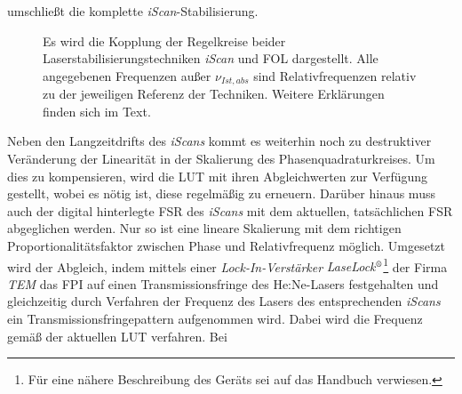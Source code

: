 umschließt die komplette \textit{iScan}-Stabilisierung.\par \begin{figure}[h]
 	\centering
	\caption[Regelkreis - Kopplung]{Es wird die
	Kopplung der Regelkreise beider
	Laserstabilisierungstechniken \textit{iScan} und
	FOL dargestellt. Alle
	angegebenen Frequenzen außer $\nu_{Ist,abs}$ sind
	Relativfrequenzen relativ zu der jeweiligen
	Referenz der Techniken. Weitere Erklärungen
	finden sich im Text.}\label{fig:regelkreis_kopplung}
\end{figure}
Neben den Langzeitdrifts des \textit{iScans} kommt es weiterhin noch zu
destruktiver Veränderung der Linearität in der Skalierung des Phasenquadraturkreises. Um
dies zu kompensieren, wird die LUT mit ihren Abgleichwerten zur
Verfügung gestellt, wobei es nötig ist, diese regelmäßig zu erneuern.
Darüber hinaus muss auch der digital hinterlegte FSR des \textit{iScans} mit dem
aktuellen, tatsächlichen FSR abgeglichen werden. Nur so ist eine lineare
Skalierung mit dem richtigen Proportionalitätsfaktor zwischen Phase und
Relativfrequenz möglich. Umgesetzt wird der Abgleich, indem mittels einer
\textit{Lock-In-Verstärker}
\textit{LaseLock$^\text{\textregistered}$}\footnote{Für eine nähere Beschreibung
des Geräts sei auf das Handbuch verwiesen.} der Firma \textit{TEM} \cite{laselock} das FPI auf einen Transmissionsfringe des He:Ne-Lasers festgehalten und gleichzeitig durch Verfahren der Frequenz des Lasers des entsprechenden \textit{iScans} ein Transmissionsfringepattern
aufgenommen wird. Dabei wird die Frequenz gemäß der aktuellen LUT verfahren. Bei
